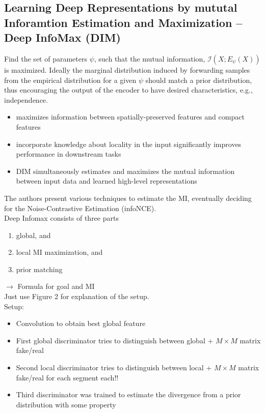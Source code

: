 \documentclass[]{article}
\begin{document}
\subsection{Learning Deep Representations by mututal Inforamtion Estimation and Maximization -- Deep InfoMax (DIM)}
Find the set of parameters $\psi$, such that the mutual information, $\mathcal{I}(X;E_\psi(X))$ is maximized. Ideally the marginal distribution induced by forwarding samples from the empirical distribution for a given $\psi$ should match a prior distribution, thus encouraging the output of the encoder to have desired characteristics, e.g., independence.
\begin{itemize}
	\item maximizes information between spatially-preserved features and compact features
	\item incorporate knowledge about locality in the input significantly improves performance in downstream tasks
	\item DIM simultaneously estimates and maximizes the mutual information between input data and learned high-level representations
\end{itemize} 

The authors present various techniques to estimate the MI, eventually deciding for the Noise-Contrastive Estimation (infoNCE).\\

Deep Infomax consists of three parts
\begin{enumerate}
	\item global, and
	\item local MI maximization, and
	\item prior matching
\end{enumerate}
$\rightarrow$ Formula for goal and MI\\

Just use Figure 2 for explanation of the setup.\\
Setup:
\begin{itemize}
	\item Convolution to obtain best global feature
	\item First global discriminator tries to distinguish between global + $M \times M$ matrix fake/real
	\item Second local discriminator tries to distinguish between local + $M \times M$ matrix fake/real for each segment each!!
	\item Third discriminator was trained to estimate the divergence from a prior distribution with some property
\end{itemize}
\end{document}
